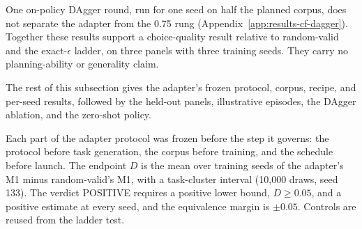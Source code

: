 One on-policy DAgger round, run for one seed on half the planned corpus, does not separate the adapter from the 0.75 rung (Appendix~\ref{app:results-cf-dagger}). Together these results support a choice-quality result relative to random-valid and the exact-$\epsilon$ ladder, on three panels with three training seeds. They carry no planning-ability or generality claim.

The rest of this subsection gives the adapter's frozen protocol, corpus, recipe, and per-seed results, followed by the held-out panels, illustrative episodes, the DAgger ablation, and the zero-shot policy.

Each part of the adapter protocol was frozen before the step it governs: the protocol before task generation, the corpus before training, and the schedule before launch. The endpoint $D$ is the mean over training seeds of the adapter's M1 minus random-valid's M1, with a task-cluster interval (10,000 draws, seed 133). The verdict POSITIVE requires a positive lower bound, $D \ge 0.05$, and a positive estimate at every seed, and the equivalence margin is $\pm 0.05$. Controls are reused from the ladder test.

